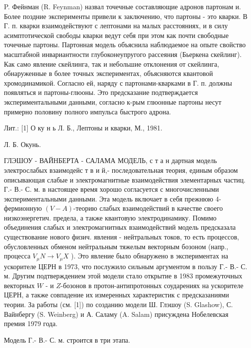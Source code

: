 \documentclass[10pt]{article}
\begin{document}
P. Фейнман (R. Feynman) назвал точечные составляющие адронов партонам и. Более поздние эксперименты привели к заключению, что партоны - это кварки. В Г. п. кварки взаимодействуют с лептонами на малых расстояниях, и в силу асимптотической свободы кварки ведут себя при этом как почти свободные точечные партоны. Партонная модель объяснила наблюдаемое на опыте свойство масштабной инвариантности глубоконеупругого рассеяния (Бьеркена скейлинг). Как само явление скейлинга, так и небольшие отклонения от скейлинга, обнаруженные в более точных экспериментах, объясняются квантовой хромодинамикой. Согласно ей, наряду с партонами-кварками в Г. п. должны появляться и партоны-глюоны. Это предсказание подтверждается экспериментальными данными, согласно к-рым глюонные партоны несут примерно половину полного импульса быстрого адрона.



Лит.: [1] О ку н ь Л. Б., Лептоны и кварки, М., 1981.



Л. Б. Окунь.



ГЛЭШОУ - ВАЙНБЕРТА - САЛАМА МОДЕЛЬ, с т а н дартная модель электрослабых взаимодейс т в и й,- последовательная теория, единым образом описывающая слабые и электромагнитные взаимодействия элементарных частиц. Г.- В.- С. м. в настоящее время хорошо согласуется с многочисленными экспериментальными данными. Эта модель включает в себя прежнюю 4-фермионную $(V-A)$-теорию слабых взаимодействий в качестве своего низкоэнергетич. предела, а также квантовую электродинамику. Помимо объединения слабых и электромагнитных взаимодействий модель предсказала существование нового физич. явления - нейтральных токов, то есть процессов, обусловленных обменом нейтральным тяжелым векторным бозоном (напр., процесса $V_{\mu} N \rightarrow V_{\mu} X$ ). Это явление было обнаружено в экспериментах на ускорителе ЦЕРН в 1973, что послужило сильным аргументом в пользу Г.- В.- С. м. Другим подтверждением этой модели стало открытие в 1983 промежуточных векторных $W$ - и $Z$-бозонов в протон-антипротонных соударениях на ускорителе ЦЕРН, а также совпадение их измеренных характеристик с предсказаниями теории. За работы (см. [1]) по созданию модели Ш. Глэшоу (S. Glashow), С. Вайнбергу (S. Weinberg) и А. Саламу (A. Salam) присуждена Нобелевская премия 1979 года.



Модель Г.- В.- С. м. строится в три этапа.
\end{document}
